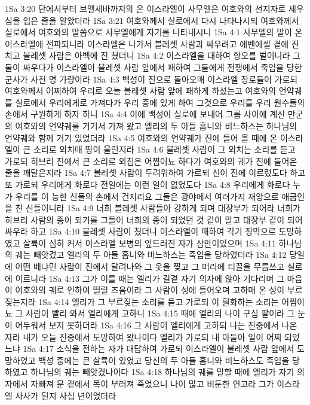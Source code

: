 1Sa 3:20  단에서부터 브엘세바까지의 온 이스라엘이 사무엘은 여호와의 선지자로 세우심을 입은 줄을 알았더라
1Sa 3:21  여호와께서 실로에서 다시 나타나시되 여호와께서 실로에서 여호와의 말씀으로 사무엘에게 자기를 나타내시니
1Sa 4:1  사무엘의 말이 온 이스라엘에 전파되니라 이스라엘은 나가서 블레셋 사람과 싸우려고 에벤에셀 곁에 진 치고 블레셋 사람은 아벡에 진 쳤더니
1Sa 4:2  이스라엘을 대하여 항오를 벌이니라 그 둘이 싸우다가 이스라엘이 블레셋 사람 앞에서 패하여 그들에게 전쟁에서 죽임을 당한 군사가 사천 명 가량이라
1Sa 4:3  백성이 진으로 돌아오매 이스라엘 장로들이 가로되 여호와께서 어찌하여 우리로 오늘 블레셋 사람 앞에 패하게 하셨는고 여호와의 언약궤를 실로에서 우리에게로 가져다가 우리 중에 있게 하여 그것으로 우리를 우리 원수들의 손에서 구원하게 하자 하니
1Sa 4:4  이에 백성이 실로에 보내어 그룹 사이에 계신 만군의 여호와의 언약궤를 거기서 가져 왔고 엘리의 두 아들 홉니와 비느하스는 하나님의 언약궤와 함께 거기 있었더라
1Sa 4:5  여호와의 언약궤가 진에 들어 올 때에 온 이스라엘이 큰 소리로 외치매 땅이 울린지라
1Sa 4:6  블레셋 사람이 그 외치는 소리를 듣고 가로되 히브리 진에서 큰 소리로 외침은 어찜이뇨 하다가 여호와의 궤가 진에 들어온 줄을 깨달은지라
1Sa 4:7  블레셋 사람이 두려워하여 가로되 신이 진에 이르렀도다 하고 또 가로되 우리에게 화로다 전일에는 이런 일이 없었도다
1Sa 4:8  우리에게 화로다 누가 우리를 이 능한 신들의 손에서 건지리요 그들은 광야에서 여러가지 재앙으로 애굽인을 친 신들이니라
1Sa 4:9  너희 블레셋 사람들아 강하게 되며 대장부가 되어라 너희가 히브리 사람의 종이 되기를 그들이 너희의 종이 되었던 것 같이 말고 대장부 같이 되어 싸우라 하고
1Sa 4:10  블레셋 사람이 쳤더니 이스라엘이 패하여 각기 장막으로 도망하였고 살륙이 심히 커서 이스라엘 보병의 엎드러진 자가 삼만이었으며
1Sa 4:11  하나님의 궤는 빼앗겼고 엘리의 두 아들 홉니와 비느하스는 죽임을 당하였더라
1Sa 4:12  당일에 어떤 베냐민 사람이 진에서 달려나와 그 옷을 찢고 그 머리에 티끌을 무릅쓰고 실로에 이르니라
1Sa 4:13  그가 이를 때는 엘리가 길곁 자기 의자에 앉아 기다리며 그 마음이 여호와의 궤로 인하여 떨릴 즈음이라 그 사람이 성에 들어오며 고하매 온 성이 부르짖는지라
1Sa 4:14  엘리가 그 부르짖는 소리를 듣고 가로되 이 훤화하는 소리는 어찜이뇨 그 사람이 빨리 와서 엘리에게 고하니
1Sa 4:15  때에 엘리의 나이 구십 팔이라 그 눈이 어두워서 보지 못하더라
1Sa 4:16  그 사람이 엘리에게 고하되 나는 진중에서 나온 자라 내가 오늘 진중에서 도망하여 왔나이다 엘리가 가로되 내 아들아 일이 어찌 되었느냐
1Sa 4:17  소식을 전하는 자가 대답하여 가로되 이스라엘이 블레셋 사람 앞에서 도망하였고 백성 중에는 큰 살륙이 있었고 당신의 두 아들 홉니와 비느하스도 죽임을 당하였고 하나님의 궤는 빼앗겼나이다
1Sa 4:18  하나님의 궤를 말할 때에 엘리가 자기 의자에서 자빠져 문 곁에서 목이 부러져 죽었으니 나이 많고 비둔한 연고라 그가 이스라엘 사사가 된지 사십 년이었더라

